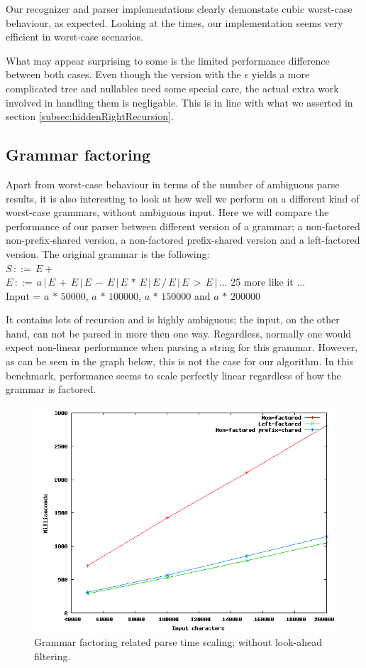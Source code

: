 \documentclass[a4paper,10pt]{article}
\begin{document}
Our recognizer and parser implementations clearly demonstate cubic worst-case behaviour, as expected. Looking at the times, our implementation seems very efficient in worst-case scenarios.

What may appear surprising to some is the limited performance difference between both cases. Even though the version with the $\epsilon$ yields a more complicated tree and nullables need some special care, the actual extra work involved in handling them is negligable. This is in line with what we asserted in section \ref{subsec:hiddenRightRecursion}.

\subsection{Grammar factoring}
\label{sec:factoringBenchmark}

Apart from worst-case behaviour in terms of the number of ambiguous parse results, it is also interesting to look at how well we perform on a different kind of worst-case grammars, without ambiguous input. Here we will compare the performance of our parser between different version of a grammar; a non-factored non-prefix-shared version, a non-factored prefix-shared version and a left-factored version. The original grammar is the following:\\
$S\,::=\,E+$\\
$E\,::=\,a\,|\,E\,+\,E\,|\,E\,-\,E\,|\,E\,*\,E\,|\,E\,/\,E\,|\,E\,>\,E\,|\,...$ 25 more like it ...\\
Input = $a\,*\,50000$, $a\,*\,100000$, $a\,*\,150000$ and $a\,*\,200000$

It contains lots of recursion and is highly ambiguous; the input, on the other hand, can not be parsed in more then one way. Regardless, normally one would expect non-linear performance when parsing a string for this grammar. However, as can be seen in the graph below, this is not the case for our algorithm. In this benchmark, performance seems to scale perfectly linear regardless of how the grammar is factored.

\begin{figure}[H]
\centering
\includegraphics[scale=0.55]{grammar-factoring.png}
\caption{Grammar factoring related parse time scaling; without look-ahead filtering.}
\end{figure}
\end{document}

